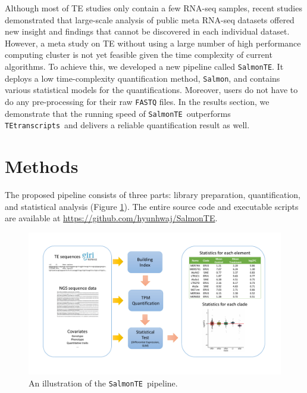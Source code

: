 \documentclass[wsdraft]{ws-procs11x85}
\newcommand{\TEtranscripts}{\texttt{TEtranscripts}}
\newcommand{\SalmonTE}{\texttt{SalmonTE}}
\begin{document}
Although most of TE studies only contain a few RNA-seq samples,
recent studies demonstrated that large-scale analysis of public meta RNA-seq datasets offered new insight and
% 
% 
% 
%
findings that cannot be discovered in each individual dataset. \cite{nellore2016human} However, a meta study on TE without using a large number of high performance computing cluster is not yet feasible given the time complexity of current algorithms.  To achieve this, we developed a new pipeline called \SalmonTE. It deploys a low time-complexity quantification method, \verb|Salmon|\cite{patro2017salmon}, and contains various statistical models for the quantifications. Moreover, users do not have to do any pre-processing for their raw \verb|FASTQ| files. 
In the results section, we demonstrate that the running speed of  \SalmonTE~outperforms \TEtranscripts~and delivers a reliable quantification result as well.

\section{Methods}

The proposed pipeline consists of three parts: library preparation, quantification, and statistical analysis (Figure \ref{aba:fig1}). 
The entire source code and executable scripts are available at \url{https://github.com/hyunhwaj/SalmonTE}. 

\begin{figure}[!ht]
\centerline{
\includegraphics[width=16cm]{fig1.pdf}
}
\caption{An illustration of the \SalmonTE~pipeline.}
\label{aba:fig1}
\end{figure}
\end{document}
